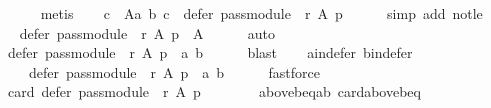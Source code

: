 \begin{isabellebody}
\ \ \ \ \isamarkupfalse%
\ metis\isanewline
\ \ \isamarkupfalse%
\ {\isachardoublequoteopen}{\isasymforall}c\ {\isasymin}\ A{\isacharminus}{\kern0pt}{\isacharbraceleft}{\kern0pt}a{\isacharcomma}{\kern0pt}\ b{\isacharbraceright}{\kern0pt}{\isachardot}{\kern0pt}\ c\ {\isasymnotin}\ defer\ {\isacharparenleft}{\kern0pt}pass{\isacharunderscore}{\kern0pt}module\ {}\ r{\isacharparenright}{\kern0pt}\ A\ p{\isachardoublequoteclose}\isanewline
\ \ \ \ \isamarkupfalse%
\ {\isacharparenleft}{\kern0pt}simp\ add{\isacharcolon}{\kern0pt}\ not{\isacharunderscore}{\kern0pt}le{\isacharparenright}{\kern0pt}\isanewline
\ \ \isamarkupfalse%
\ \isamarkupfalse%
\ {\isachardoublequoteopen}defer\ {\isacharparenleft}{\kern0pt}pass{\isacharunderscore}{\kern0pt}module\ {}\ r{\isacharparenright}{\kern0pt}\ A\ p\ {\isasymsubseteq}\ A{\isachardoublequoteclose}\isanewline
\ \ \ \ \isamarkupfalse%
\ auto\isanewline
\ \ \isamarkupfalse%
\ \isamarkupfalse%
\ {\isachardoublequoteopen}defer\ {\isacharparenleft}{\kern0pt}pass{\isacharunderscore}{\kern0pt}module\ {}\ r{\isacharparenright}{\kern0pt}\ A\ p\ {\isasymsubseteq}\ {\isacharbraceleft}{\kern0pt}a{\isacharcomma}{\kern0pt}\ b{\isacharbraceright}{\kern0pt}{\isachardoublequoteclose}\isanewline
\ \ \ \ \isamarkupfalse%
\ blast\isanewline
\ \ \isamarkupfalse%
\ a{\isacharunderscore}{\kern0pt}in{\isacharunderscore}{\kern0pt}defer\ b{\isacharunderscore}{\kern0pt}in{\isacharunderscore}{\kern0pt}defer\ \isamarkupfalse%
\isanewline
\ \ \ \ {\isachardoublequoteopen}defer\ {\isacharparenleft}{\kern0pt}pass{\isacharunderscore}{\kern0pt}module\ {}\ r{\isacharparenright}{\kern0pt}\ A\ p\ {\isacharequal}{\kern0pt}\ {\isacharbraceleft}{\kern0pt}a{\isacharcomma}{\kern0pt}\ b{\isacharbraceright}{\kern0pt}{\isachardoublequoteclose}\isanewline
\ \ \ \ \isamarkupfalse%
\ fastforce\isanewline
\ \ \isamarkupfalse%
\ {\isachardoublequoteopen}card\ {\isacharparenleft}{\kern0pt}defer\ {\isacharparenleft}{\kern0pt}pass{\isacharunderscore}{\kern0pt}module\ {}\ r{\isacharparenright}{\kern0pt}\ A\ p{\isacharparenright}{\kern0pt}\ {\isacharequal}{\kern0pt}\ {}{\isachardoublequoteclose}\isanewline
\ \ \ \ \isamarkupfalse%
\ above{\isacharunderscore}{\kern0pt}b{\isacharunderscore}{\kern0pt}eq{\isacharunderscore}{\kern0pt}ab\ card{\isacharunderscore}{\kern0pt}above{\isacharunderscore}{\kern0pt}b{\isacharunderscore}{\kern0pt}eq{\isacharunderscore}{\kern0pt}{}\isanewline

\end{isabellebody}
